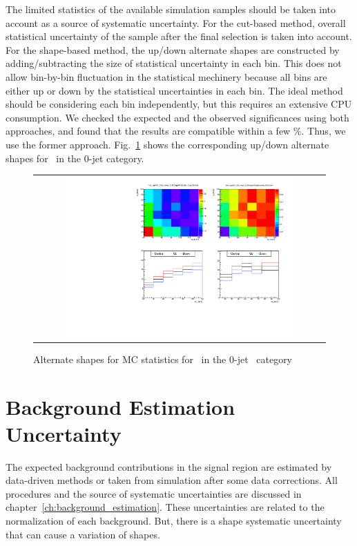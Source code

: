 The limited statistics of the available simulation samples should be taken 
into account as a source of systematic uncertainty. 
For the cut-based method, overall statistical uncertainty of the sample 
after the final selection is taken into account. 
For the shape-based method, the up/down alternate shapes are constructed 
by adding/subtracting the size of statistical uncertainty in each bin. 
This does not allow bin-by-bin fluctuation in the statistical mechinery 
because all bins are either up or down by the statistical uncertainties 
in each bin. The ideal method should be considering each bin independently,
but this requires an extensive CPU consumption. 
We checked the expected and the observed significances using both approaches,
and found that the results are compatible within a few \%. 
Thus, we use the former approach. 
Fig.~\ref{fig:alter_stat} shows the corresponding up/down alternate shapes
for \ggww\ in the 0-jet category. 
%
\begin{figure}[htp]
\centering
\begin{tabular}{c}
\includegraphics[width=0.8\textwidth]{figures/histo_ggWW_CMS_hww_of_0j_MVAggWWStatBounding_8TeV_0j_zoom.pdf}
\end{tabular}
\caption{Alternate shapes for MC statistics for \ggww\ in the 0-jet \DF\ category }
\label{fig:alter_stat}
\end{figure}



\section{Background Estimation Uncertainty} 

The expected background contributions in the signal region are estimated by 
data-driven methods or taken from simulation after some data corrections.  
All procedures and the source of systematic uncertainties are discussed 
in chapter~\ref{ch:background_estimation}. These uncertainties are related 
to the normalization of each background. But, there is a shape systematic uncertainty 
that can cause a variation of shapes. 


